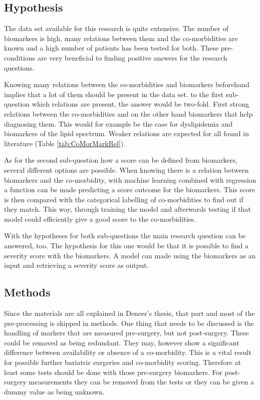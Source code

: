 \documentclass[10pt,a4paper]{article}
\begin{document}
	\subsection{Hypothesis}
	
	The data set available for this research is quite extensive. The number of biomarkers is high, many relations between them and the co-morbidities are known and a high number of patients has been tested for both. These pre-conditions are very beneficial to finding positive answers for the research questions.
	
	Knowing many relations between the co-morbidities and biomarkers beforehand implies that a lot of them should be present in the data set. to the first sub-question which relations are present, the answer would be two-fold. First strong relations between the co-morbidities and on the other hand biomarkers that help diagnosing them. This would for example be the case for dyslipidemia and biomarkers of the lipid spectrum. Weaker relations are expected for all found in literature (Table \ref{tab:CoMorMarkRel}).
	
	As for the second sub-question how a score can be defined from biomarkers, several different options are possible. When knowing there is a relation between biomarkers and the co-morbidity, with machine learning combined with regression a function can be made predicting a score outcome for the biomarkers. This score is then compared with the categorical labelling of co-morbidities to find out if they match. This way, through training the model and afterwards testing if that model could efficiently give a good score to the co-morbidities.
	
	With the hypotheses for both sub-questions the main research question can be answered, too. The hypothesis for this one would be that it is possible to find a severity score with the biomarkers. A model can made using the biomarkers as an input and retrieving a severity score as output.
	
	\subsection{Methods}
	
	Since the materials are all explained in Deneer's thesis, that part and most of the pre-processing is skipped in methods. One thing that needs to be discussed is the handling of markers that are measured pre-surgery, but not post-surgery. These could be removed as being redundant. They may, however show a significant difference between availability or absence of a co-morbidity. This is a vital result for possible further bariatric surgeries and co-morbidity scoring. Therefore at least some tests should be done with those pre-surgery biomarkers. For post-surgery measurements they can be removed from the tests or they can be given a dummy value as being unknown.
	
\end{document}
